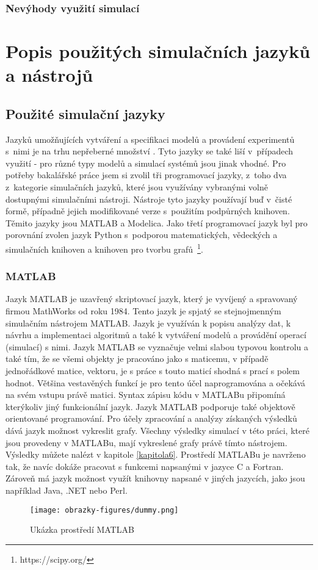 \subsection{Nevýhody využití simulací}


\chapter{Popis použitých simulačních jazyků a nástrojů}
\label{kapitola3}

\section{Použité simulační jazyky}
Jazyků umožňujících vytváření a specifikaci modelů a provádení experimentů s~nimi je na trhu nepřeberné množství \cite{list-of-process-modelling-lang}. Tyto jazyky se také liší v~případech využití - pro různé typy modelů a simulací systémů jsou jinak vhodné. Pro potřeby bakalářské práce jsem si zvolil tři programovací jazyky, z~toho dva z~kategorie simulačních jazyků, které jsou využívány vybranými volně dostupnými simulačními nástroji. Nástroje tyto jazyky používají buď v~čisté formě, případně jejich modifikované verze s~použitím podpůrných knihoven. Těmito jazyky jsou MATLAB a Modelica. Jako třetí programovací jazyk byl pro porovnání zvolen jazyk Python s~podporou matematických, vědeckých a simulačních knihoven a knihoven pro tvorbu grafů~\footnote{https://scipy.org/}.

\subsection{MATLAB}
Jazyk MATLAB je uzavřený skriptovací jazyk, který je vyvíjený a spravovaný firmou MathWorks od roku 1984. Tento jazyk je spjatý se stejnojmenným simulačním nástrojem MATLAB. Jazyk je využíván k popisu analýzy dat, k návrhu a implementaci algoritmů a také k vytváření modelů a provádění operací (simulací) s nimi. Jazyk MATLAB se vyznačuje velmi slabou typovou kontrolu a také tím, že se všemi objekty je pracováno jako s maticemu, v případě jednořádkové matice, vektoru, je s práce s touto maticí shodná s prací s polem hodnot. Většina vestavěných funkcí je pro tento účel naprogramována a očekává na svém vstupu právě matici. Syntax zápisu kódu v MATLABu připomíná kterýkoliv jiný funkcionální jazyk. Jazyk MATLAB podporuje také objektově orientované programování. Pro účely zpracování a analýzy získaných výsledků dává jazyk možnost vykreslit grafy. Všechny výsledky simulací v této práci, které jsou provedeny v MATLABu, mají vykreslené grafy právě tímto nástrojem. Výsledky můžete nalézt v kapitole \ref{kapitola6}. Prostředí MATLABu je navrženo tak, že navíc dokáže pracovat s funkcemi napsanými v jazyce C a Fortran. Zároveň má jazyk možnost využít knihovny napsané v jiných jazycích, jako jsou například Java, .NET nebo Perl.
\begin{figure}
    \centering
    \texttt{[image: obrazky-figures/dummy.png]}
    \caption{Ukázka prostředí MATLAB}
    \label{fig:matlab}
\end{figure}

